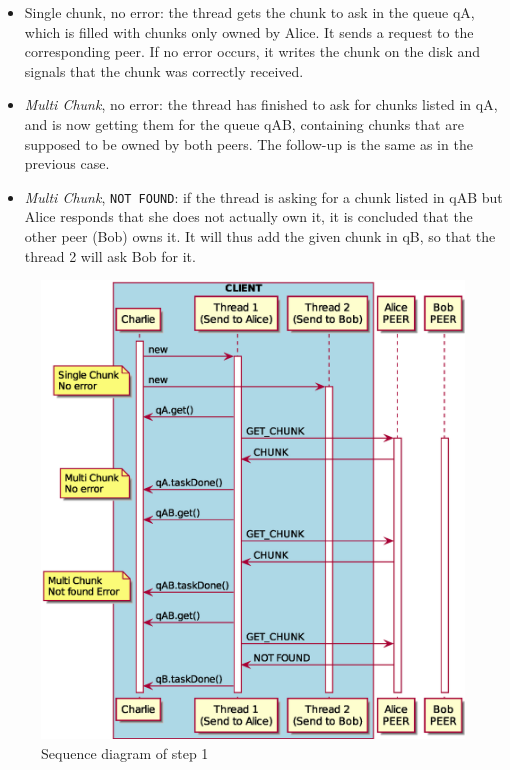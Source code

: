 \begin{itemize}
	\item Single chunk, no error: the thread gets the chunk to ask in the queue qA, which is filled with chunks only owned by Alice. It sends a request to the corresponding peer. If no error occurs, it writes the chunk on the disk and signals that the chunk was correctly received.
	
	\item \textit{Multi Chunk}, no error: the thread has finished to ask for chunks listed in qA, and is now getting them for the queue qAB, containing chunks that are supposed to be owned by both peers. The follow-up is the same as in the previous case.
	
	\item \textit{Multi Chunk}, \texttt{NOT FOUND}: if the thread is asking for a chunk listed in qAB but Alice responds that she does not actually own it, it is concluded that the other peer (Bob) owns it. It will thus add the given chunk in qB, so that the thread 2 will ask Bob for it.
\end{itemize}

\begin{figure}
	\centering
	\includegraphics[width=\textwidth]{img/step1.eps}
	\caption{Sequence diagram of step 1}
	\label{fig:step1}
\end{figure}